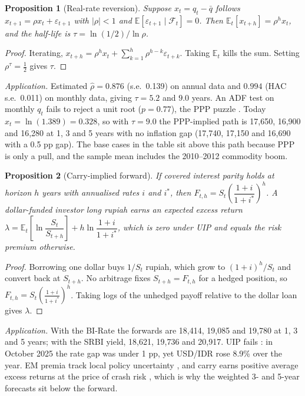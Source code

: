 \documentclass[10pt]{article}
\theoremstyle{plain}\newtheorem{proposition}{Proposition}
\theoremstyle{remark}\newtheorem*{remark}{Remark}
\newcommand{\E}{\mathbb{E}}
\begin{document}
\begin{proposition}[Real-rate reversion]
Suppose $x_t=q_t-\bar q$ follows $x_{t+1}=\rho x_t+\varepsilon_{t+1}$ with $|\rho|<1$ and $\E[\varepsilon_{t+1}\mid\mathcal F_t]=0$. Then $\E_t[x_{t+h}]=\rho^h x_t$, and the half-life is $\tau=\ln(1/2)/\ln\rho$.
\end{proposition}
\begin{proof}
Iterating, $x_{t+h}=\rho^h x_t+\sum_{k=1}^{h}\rho^{h-k}\varepsilon_{t+k}$. Taking $\E_t$ kills the sum. Setting $\rho^\tau=\tfrac12$ gives $\tau$. \qedhere
\end{proof}
\textit{Application.} Estimated $\hat\rho=0.876$ (s.e.\ 0.139) on annual data and $0.994$ (HAC s.e.\ 0.011) on monthly data, giving $\tau=5.2$ and $9.0$ years. An ADF test on monthly $q_t$ fails to reject a unit root ($p=0.77$), the PPP puzzle \citep{rogoff1996,lothian1996}. Today $x_t=\ln(1.389)=0.328$, so with $\tau=9.0$ the PPP-implied path is 17,650, 16,900 and 16,280 at 1, 3 and 5 years with no inflation gap (17,740, 17,150 and 16,690 with a 0.5 pp gap). The base cases in the table sit above this path because PPP is only a pull, and the sample mean includes the 2010--2012 commodity boom.

\begin{proposition}[Carry-implied forward]
If covered interest parity holds at horizon $h$ years with annualised rates $i$ and $i^*$, then $F_{t,h}=S_t\left(\dfrac{1+i}{1+i^*}\right)^{h}$. A dollar-funded investor long rupiah earns an expected excess return $\lambda=\E_t\!\left[\ln\dfrac{S_t}{S_{t+h}}\right]+h\ln\dfrac{1+i}{1+i^*}$, which is zero under UIP and equals the risk premium otherwise.
\end{proposition}
\begin{proof}
Borrowing one dollar buys $1/S_t$ rupiah, which grow to $(1+i)^h/S_t$ and convert back at $S_{t+h}$. No arbitrage fixes $S_{t+h}=F_{t,h}$ for a hedged position, so $F_{t,h}=S_t\left(\frac{1+i}{1+i^*}\right)^{h}$. Taking logs of the unhedged payoff relative to the dollar loan gives $\lambda$. \qedhere
\end{proof}
\textit{Application.} With the BI-Rate the forwards are 18,414, 19,085 and 19,780 at 1, 3 and 5 years; with the SRBI yield, 18,621, 19,736 and 20,917. UIP fails \citep{fama1984}: in October 2025 the rate gap was under 1 pp, yet USD/IDR rose 8.9\% over the year. EM premia track local policy uncertainty \citep{kalemli2026}, and carry earns positive average excess returns at the price of crash risk \citep{lustig2007,brunnermeier2008}, which is why the weighted 3- and 5-year forecasts sit below the forward.
\end{document}
